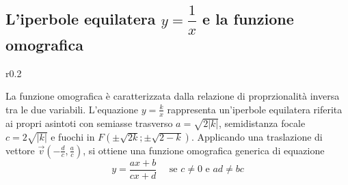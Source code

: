 \documentclass{article}     %
\begin{document}
    \subsection{L'iperbole equilatera $y=\dfrac{1}{x}$ e la funzione omografica}
        \begin{wrapfigure}[10]{r}{0.2\textwidth}
            \begin{center}
            \end{center}
        \end{wrapfigure}
        La funzione omografica è caratterizzata dalla relazione di proprzionalità inversa tra le due variabili. L'equazione $y=\frac{k}{x}$ rappresenta un'iperbole equilatera riferita ai propri asintoti con semiasse trasverso $a=\sqrt{2|k|}$, semidistanza focale $c=2\sqrt{|k|}$ e fuochi in $F(\pm\sqrt{2k};\pm\sqrt{2-k})$. Applicando una traslazione di vettore $\vec{v}(-\frac{d}{c},\frac{a}{c})$, si ottiene una funzione omografica generica di equazione \[y=\frac{ax+b}{cx+d}~~~~~~\text{se }c\neq0 \text{ e }ad\neq bc\]\\
\end{document}
